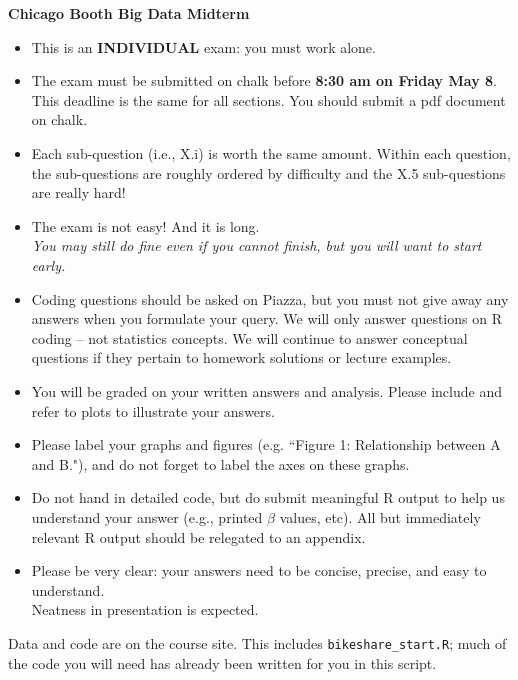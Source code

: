 \documentclass[12pt]{article}
\begin{document}
\pagestyle{empty} 


{\bf   \huge {} Chicago Booth Big Data Midterm }

\vskip 2cm
\begin{itemize}
\item {\color{Maroon} This is an {\bf INDIVIDUAL} exam: you must work alone.}
\item {\color{Maroon} The exam must be submitted on chalk before {\bf 8:30 am on Friday May 8}}. \\ This deadline is the same for all sections.  You should submit a pdf document on chalk.
\item Each sub-question (i.e., {X.i}) is worth the same amount.  Within each question, the sub-questions are roughly ordered by difficulty and the X.5 sub-questions are really hard!
\item The exam is not easy!   And it is long.  \\{\it You may still do fine even if you cannot finish, but you will want to start early.} 
\item Coding questions should be asked on Piazza, but you must not give away any answers when you formulate your query. We will only answer questions on R coding -- not statistics concepts.  
We will continue to answer conceptual questions if they pertain to homework solutions or lecture examples.
\item You will be graded on your written answers and analysis.  Please include and refer to plots to illustrate your answers.  
\item Please label your graphs and figures (e.g. ``Figure 1: Relationship between A and B."), and do not forget to label the axes on these graphs.
\item Do not hand in detailed code, but do submit meaningful R output to help us understand your answer (e.g., printed $\hat\beta$ values, etc).  { All but immediately relevant R output should be relegated to an appendix.}
\item Please be very clear: your answers need to be concise, precise, and easy to understand. \\ Neatness in presentation is expected.
\end{itemize}


\newpage
{}

\bigskip

\noindent
Data and code are on the course site. 
	This includes {\tt bikeshare\_start.R}; 
	much of the code you will need has already been written for you in this script.
\end{document}
